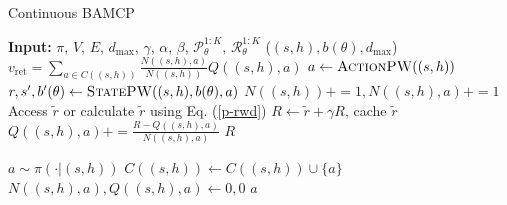 

\begin{algorithm}[t]
  \caption{Continuous BAMCP}
  \label{alg:2}
  \begin{multicols}{2}
    \begin{algorithmic}
      \State \textbf{Input:} $\pi$, $V$, $E$, $d_{\text{max}}$, $\gamma$, $\alpha$, $\beta$, $\mathcal{P}_\theta^{1:K}$, $\mathcal{R}_\theta^{1:K}$
        \State {}($(s, h), b(\theta), d_{\text{max}}$)
        \EndFor
        \State $v_{\text{ret}} = \sum_{a \in C((s, h))} \frac{N((s, h), a)}{N((s, h))} Q((s, h), a)$
      \EndProcedure
        \State $a \leftarrow \textproc{ActionPW}((s, h))$
        \State $r, s', b'(\theta) \leftarrow \textproc{StatePW}((s, h), b(\theta), a)$
        \State $N((s, h)) \mathrel{{+}{=}} 1, N((s, h), a) \mathrel{{+}{=}} 1$
        \Else
        \State {\color{blue}{\small $R \leftarrow V((s', hars'))$}}
        \EndIf
        \State Access $\tilde{r}$ or calculate $\tilde{r}$ using Eq. (\ref{p-rwd})
        \State $R \leftarrow \tilde{r} + \gamma R$, cache $\tilde{r}$
        \State $Q((s, h), a) \mathrel{{+}{=}} \frac{R - Q((s, h), a)}{N((s, h), a)}$
        \State \Return $R$ 
      \EndProcedure
    \end{algorithmic}
    \columnbreak
    \begin{algorithmic}
        \State $a \sim \pi(\cdot|(s, h))$
        \State $C((s, h)) \leftarrow C((s, h)) \cup \{a\}$
        \State $N((s, h), a), Q((s, h), a) \leftarrow 0, 0$
        \Else
        \EndIf
        \State \Return $a$
      \EndProcedure

\end{algorithmic}
\end{multicols}
\end{algorithm}
